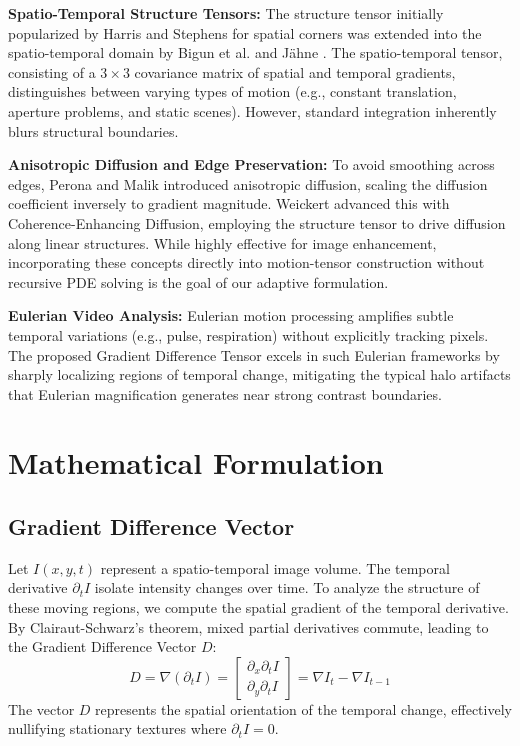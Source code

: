 \documentclass[preprint,12pt]{elsarticle}
\begin{document}
\textbf{Spatio-Temporal Structure Tensors:} The structure tensor initially popularized by Harris and Stephens \cite{Harris1988} for spatial corners was extended into the spatio-temporal domain by Bigun et al. \cite{Bigun1991} and J{\"a}hne \cite{Jahne1993}. The spatio-temporal tensor, consisting of a $3\times3$ covariance matrix of spatial and temporal gradients, distinguishes between varying types of motion (e.g., constant translation, aperture problems, and static scenes). However, standard integration inherently blurs structural boundaries.

\textbf{Anisotropic Diffusion and Edge Preservation:} To avoid smoothing across edges, Perona and Malik \cite{Perona1990} introduced anisotropic diffusion, scaling the diffusion coefficient inversely to gradient magnitude. Weickert \cite{Weickert1999} advanced this with Coherence-Enhancing Diffusion, employing the structure tensor to drive diffusion along linear structures. While highly effective for image enhancement, incorporating these concepts directly into motion-tensor construction without recursive PDE solving is the goal of our adaptive formulation.

\textbf{Eulerian Video Analysis:} Eulerian motion processing \cite{Wu2012} amplifies subtle temporal variations (e.g., pulse, respiration) without explicitly tracking pixels. The proposed Gradient Difference Tensor excels in such Eulerian frameworks by sharply localizing regions of temporal change, mitigating the typical halo artifacts that Eulerian magnification generates near strong contrast boundaries.

\section{Mathematical Formulation}
\label{sec:math}

\subsection{Gradient Difference Vector}
Let $I(x, y, t)$ represent a spatio-temporal image volume. The temporal derivative $\partial_t I$ isolate intensity changes over time. To analyze the structure of these moving regions, we compute the spatial gradient of the temporal derivative. By Clairaut-Schwarz's theorem, mixed partial derivatives commute, leading to the Gradient Difference Vector $D$:
\begin{equation} \label{eq:gradient_diff}
    D = \nabla(\partial_t I) = \begin{bmatrix} \partial_x \partial_t I \\ \partial_y \partial_t I \end{bmatrix} = \nabla I_t - \nabla I_{t-1}
\end{equation}
The vector $D$ represents the spatial orientation of the temporal change, effectively nullifying stationary textures where $\partial_t I = 0$.
\end{document}
